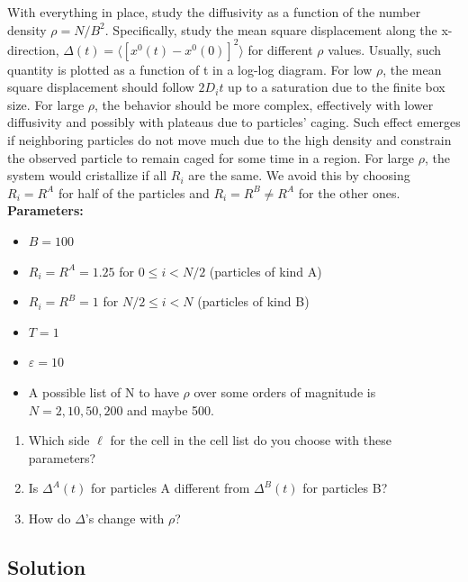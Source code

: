 \documentclass[../main.tex]{subfiles}
\begin{document}
With everything in place, study the diffusivity as a function of the number density $\rho=N/B^{2}$. Specifically, study the mean square displacement along the x-direction, $\Delta(t)=\langle[x^{0}(t)-x^{0}(0)]^{2}\rangle$ for different $\rho$ values. Usually, such quantity is plotted as a function of t in a log-log diagram. For low $\rho$, the mean square displacement should follow $2D_{i}t$ up to a saturation due to the finite box size. For large $\rho$, the behavior should be more complex, effectively with lower diffusivity and possibly with plateaus due to particles' caging. Such effect emerges if neighboring particles do not move much due to the high density and constrain the observed particle to remain caged for some time in a region. For large $\rho$, the system would cristallize if all $R_{i}$ are the same. We avoid this by choosing $R_{i}=R^{A}$ for half of the particles and $R_{i}=R^{B}\ne R^{A}$ for the other ones.
\newline
\textbf{Parameters:}\newline
\begin{itemize}
    \item $B=100$
    \item $R_{i}=R^{A}=1.25$ for $0\le i<N/2$ (particles of kind A)
    \item $R_{i}=R^{B}=1$ for $N/2\le i<N$ (particles of kind B)
    \item $T=1$ 
    \item $\varepsilon=10$ 
    \item A possible list of N to have $\rho$ over some orders of magnitude is $N=2,10,50,200$ and maybe 500.
\end{itemize}

\begin{enumerate}
    \item Which side $\ell$ for the cell in the cell list do you choose with these parameters?
    \item Is $\Delta^{A}(t)$ for particles A different from $\Delta^{B}(t)$ for particles B?
    \item How do $\Delta$'s change with $\rho$?
\end{enumerate}

\subsection{Solution}
\end{document}
